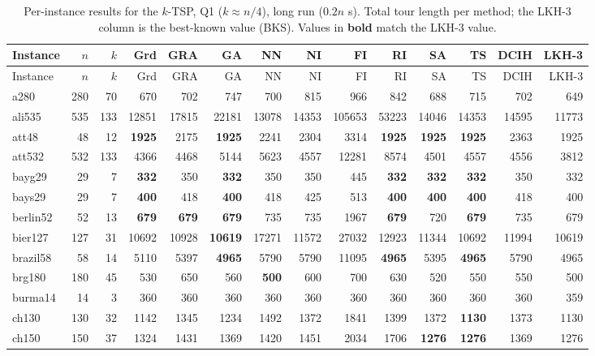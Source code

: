 {\footnotesize\setlength{\tabcolsep}{3pt}
\begin{longtable}{l r r r r r r r r r r r r r}
\caption{Per-instance results for the $k$-TSP, Q1 ($k\approx n/4$), long run ($0.2n$ s). Total tour length per method; the LKH-3 column is the best-known value (BKS). Values in \textbf{bold} match the LKH-3 value.}\label{tab:app_lr_small}\\
\hline Instance & $n$ & $k$ & Grd & GRA & GA & NN & NI & FI & RI & SA & TS & DCIH & LKH-3 \\ \hline \endfirsthead
\hline Instance & $n$ & $k$ & Grd & GRA & GA & NN & NI & FI & RI & SA & TS & DCIH & LKH-3 \\ \hline \endhead
\hline \endfoot
a280 & 280 & 70 & 670 & 702 & 747 & 700 & 815 & 966 & 842 & 688 & 715 & 702 & 649 \\
ali535 & 535 & 133 & 12851 & 17815 & 22181 & 13078 & 14353 & 105653 & 53223 & 14046 & 14353 & 14595 & 11773 \\
att48 & 48 & 12 & \textbf{1925} & 2175 & \textbf{1925} & 2241 & 2304 & 3314 & \textbf{1925} & \textbf{1925} & \textbf{1925} & 2363 & 1925 \\
att532 & 532 & 133 & 4366 & 4468 & 5144 & 5623 & 4557 & 12281 & 8574 & 4501 & 4557 & 4556 & 3812 \\
bayg29 & 29 & 7 & \textbf{332} & 350 & \textbf{332} & 350 & 350 & 445 & \textbf{332} & \textbf{332} & \textbf{332} & 350 & 332 \\
bays29 & 29 & 7 & \textbf{400} & 418 & \textbf{400} & 418 & 425 & 513 & \textbf{400} & \textbf{400} & \textbf{400} & 418 & 400 \\
berlin52 & 52 & 13 & \textbf{679} & \textbf{679} & \textbf{679} & 735 & 735 & 1967 & \textbf{679} & 720 & \textbf{679} & 735 & 679 \\
bier127 & 127 & 31 & 10692 & 10928 & \textbf{10619} & 17271 & 11572 & 27032 & 12923 & 11344 & 10692 & 11994 & 10619 \\
brazil58 & 58 & 14 & 5110 & 5397 & \textbf{4965} & 5790 & 5790 & 11095 & \textbf{4965} & 5395 & \textbf{4965} & 5790 & 4965 \\
brg180 & 180 & 45 & 530 & 650 & 560 & \textbf{500} & 600 & 700 & 630 & 520 & 550 & 550 & 500 \\
burma14 & 14 & 3 & 360 & 360 & 360 & 360 & 360 & 360 & 360 & 360 & 360 & 360 & 359 \\
ch130 & 130 & 32 & 1142 & 1345 & 1234 & 1492 & 1372 & 1841 & 1399 & 1372 & \textbf{1130} & 1373 & 1130 \\
ch150 & 150 & 37 & 1324 & 1431 & 1369 & 1420 & 1451 & 2034 & 1706 & \textbf{1276} & \textbf{1276} & 1369 & 1276 \\

\end{longtable}}
